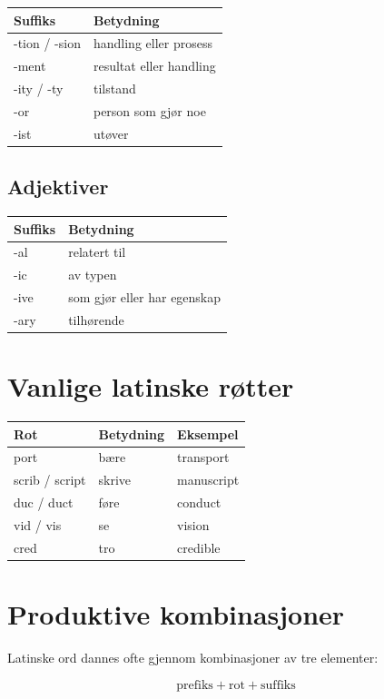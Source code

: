 \documentclass{article}
\begin{document}
\begin{tabular}{ll}
\toprule
Suffiks & Betydning \\
\midrule
-tion / -sion & handling eller prosess \\
-ment & resultat eller handling \\
-ity / -ty & tilstand \\
-or & person som gjør noe \\
-ist & utøver \\
\bottomrule
\end{tabular}

\subsection{Adjektiver}

\begin{tabular}{ll}
\toprule
Suffiks & Betydning \\
\midrule
-al & relatert til \\
-ic & av typen \\
-ive & som gjør eller har egenskap \\
-ary & tilhørende \\
\bottomrule
\end{tabular}

\section{Vanlige latinske røtter}

\begin{tabular}{lll}
\toprule
Rot & Betydning & Eksempel \\
\midrule
port & bære & transport \\
scrib / script & skrive & manuscript \\
duc / duct & føre & conduct \\
vid / vis & se & vision \\
cred & tro & credible \\
\bottomrule
\end{tabular}

\section{Produktive kombinasjoner}

Latinske ord dannes ofte gjennom kombinasjoner av tre elementer:

\[
\text{prefiks} + \text{rot} + \text{suffiks}
\]
\end{document}
